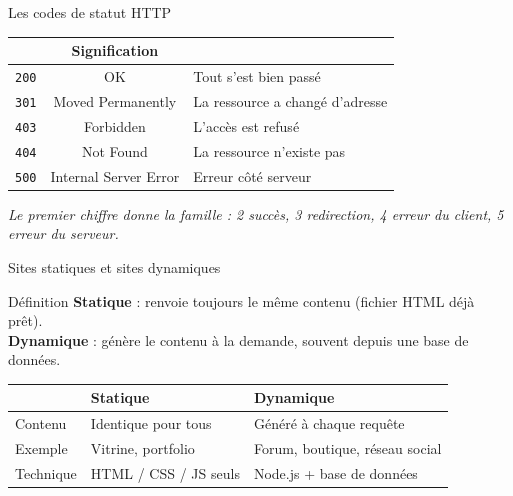 \documentclass[aspectratio=169,11pt]{beamer}
\newcommand{\hdr}[1]{\multicolumn{1}{l}{\color{white}\bfseries #1}}
\newcommand{\hdrc}[1]{\multicolumn{1}{c}{\color{white}\bfseries #1}}
\begin{document}
\begin{frame}{Les codes de statut HTTP}
  \vspace{0.2cm}
  \begin{center}
  \begin{tabular}{cc>{\raggedright\arraybackslash}m{5.2cm}}
    \toprule
    \rowcolor{accentBlue}
  \hdrc{Code} &  \hdrc{Signification} &  \hdr{Quand ?} \\
    \midrule
    \rowcolor{cfptGrey}
    \texttt{200} & OK & Tout s'est bien passé \\
    \texttt{301} & Moved Permanently & La ressource a changé d'adresse \\
    \rowcolor{cfptGrey}
    \texttt{403} & Forbidden & L'accès est refusé \\
    \texttt{404} & Not Found & La ressource n'existe pas \\
    \rowcolor{cfptGrey}
    \texttt{500} & Internal Server Error & Erreur côté serveur \\
    \bottomrule
  \end{tabular}
  \end{center}
  \vspace{0.2cm}
  \begin{center}
    \small\itshape Le premier chiffre donne la famille : 2 succès, 3 redirection, 4 erreur du client, 5 erreur du serveur.
  \end{center}
\end{frame}

\begin{frame}{Sites statiques et sites dynamiques}
  \small
  \begin{block}{Définition}
    \textbf{Statique} : renvoie toujours le même contenu (fichier HTML déjà prêt).\\
    \textbf{Dynamique} : génère le contenu à la demande, souvent depuis une base de données.
  \end{block}
  \vspace{0.1cm}
  \begin{center}
  \begin{tabularx}{\textwidth}{lXX}
    \toprule
    \rowcolor{accentBlue}
  \hdr{} &  \hdr{Statique} &  \hdr{Dynamique} \\
    \midrule
    \rowcolor{cfptGrey}
    Contenu & Identique pour tous & Généré à chaque requête \\
    Exemple & Vitrine, portfolio & Forum, boutique, réseau social \\
    \rowcolor{cfptGrey}
    Technique & HTML / CSS / JS seuls & Node.js + base de données \\
    \bottomrule
  \end{tabularx}
  \end{center}
\end{frame}
\end{document}
